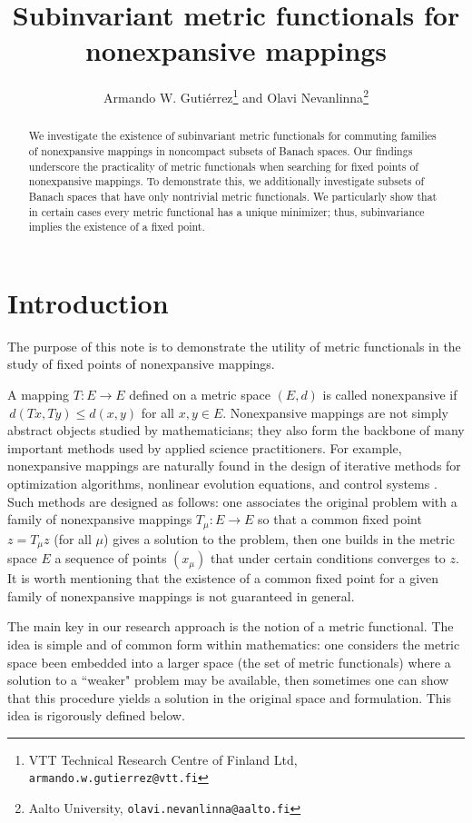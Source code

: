 \documentclass[a4paper,12pt]{article}
\author{
    Armando W. Guti\'{e}rrez\thanks{
        VTT Technical Research Centre of Finland Ltd, \texttt{armando.w.gutierrez@vtt.fi}} 
    \; and \; 
    Olavi Nevanlinna\thanks{
        Aalto University, 
        \texttt{olavi.nevanlinna@aalto.fi}}
    }
\title{Subinvariant metric functionals for 
nonexpansive mappings}
\date{}
\theoremstyle{definition}
\numberwithin{equation}{section}
\numberwithin{equation}{section}
\begin{document}
\maketitle

\begin{abstract}
We investigate the existence of subinvariant 
metric functionals for commuting families of 
nonexpansive mappings in noncompact subsets 
of Banach spaces. Our findings underscore 
the practicality of metric functionals when
searching for fixed points of nonexpansive 
mappings. To demonstrate 
this, we additionally investigate subsets of 
Banach spaces that have only nontrivial 
metric functionals. We particularly show that 
in certain cases every metric functional has 
a unique minimizer; thus, subinvariance 
implies the existence of a fixed point.
\end{abstract}

\section{Introduction}
The purpose of this note is to demonstrate 
the utility of metric functionals in the 
study of fixed points of nonexpansive mappings. 

A mapping $T:E \to E$ defined on a metric 
space $(E,d)$ is called nonexpansive if 
$\,d(Tx,Ty) \leq d(x,y)$ for all $x,y\in E$.
Nonexpansive mappings are not simply abstract 
objects studied by mathematicians; they also 
form the backbone of many important 
methods used by applied science
practitioners. For example, nonexpansive 
mappings are naturally found in the design of 
iterative methods for optimization 
algorithms, nonlinear evolution equations,
and control systems \cite{NAandOpt2010, FPalg2011}.
Such methods are designed as follows: one 
associates the original problem with a family 
of nonexpansive mappings $T_{\mu}:E\to E$ so
that a common fixed point $z=T_{\mu} z$ 
(for all $\mu$) gives a solution to the 
problem, then one builds in the metric 
space $E$ a sequence of points $(x_\mu)$ that
under certain conditions converges to $z$. 
It is worth mentioning that the existence of 
a common fixed point for a given family of 
nonexpansive mappings is not guaranteed in 
general.

The main key in our research approach is the 
notion of a metric functional. The idea is 
simple and of common form within mathematics: 
one considers the metric space been 
embedded into a larger space (the set of 
metric functionals) where a solution to a
``weaker" problem may be available, then 
sometimes one can show that this procedure
yields a solution in the original space and 
formulation. This idea is rigorously defined 
below.
 
\end{document}
